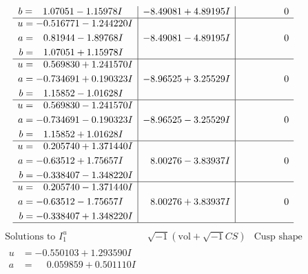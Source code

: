 \documentclass[1p]{elsarticle_modified}
\theoremstyle{definition}
\newcommand{\I}{\sqrt{-1}}
\begin{document}
$$\begin{array}{c|c|c}
\begin{aligned}
b &= \phantom{-}1.07051 - 1.15978 I\end{aligned}
 & -8.49081 + 4.89195 I & \phantom{-0.000000 } 0 \\ \hline\begin{aligned}
u &= -0.516771 - 1.244220 I \\
a &= \phantom{-}0.81944 - 1.89768 I \\
b &= \phantom{-}1.07051 + 1.15978 I\end{aligned}
 & -8.49081 - 4.89195 I & \phantom{-0.000000 } 0 \\ \hline\begin{aligned}
u &= \phantom{-}0.569830 + 1.241570 I \\
a &= -0.734691 + 0.190323 I \\
b &= \phantom{-}1.15852 - 1.01628 I\end{aligned}
 & -8.96525 + 3.25529 I & \phantom{-0.000000 } 0 \\ \hline\begin{aligned}
u &= \phantom{-}0.569830 - 1.241570 I \\
a &= -0.734691 - 0.190323 I \\
b &= \phantom{-}1.15852 + 1.01628 I\end{aligned}
 & -8.96525 - 3.25529 I & \phantom{-0.000000 } 0 \\ \hline\begin{aligned}
u &= \phantom{-}0.205740 + 1.371440 I \\
a &= -0.63512 + 1.75657 I \\
b &= -0.338407 - 1.348220 I\end{aligned}
 & \phantom{-}8.00276 - 3.83937 I & \phantom{-0.000000 } 0 \\ \hline\begin{aligned}
u &= \phantom{-}0.205740 - 1.371440 I \\
a &= -0.63512 - 1.75657 I \\
b &= -0.338407 + 1.348220 I\end{aligned}
 & \phantom{-}8.00276 + 3.83937 I & \phantom{-0.000000 } 0\\
 \hline 
 \end{array}$$\newpage$$\begin{array}{c|c|c}  
\text{Solutions to }I^u_{1}& \I (\text{vol} + \sqrt{-1}CS) & \text{Cusp shape}\\
 \hline 
\begin{aligned}
u &= -0.550103 + 1.293590 I \\
a &= \phantom{-}0.059859 + 0.501110 I \\

\end{aligned}
\end{array}$$
\end{document}
